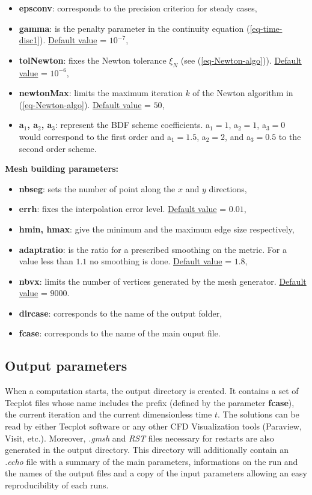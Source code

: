 \begin{itemize}
   \item {\bf epsconv}: corresponds to the precision criterion for steady cases,
   \item {\bf gamma}: is the penalty parameter in the continuity equation (\ref{eq-time-disc1}). \underline{Default value} = $10^{-7}$,
   \item {\bf tolNewton}: fixes the Newton tolerance $\xi_N$ (see (\ref{eq-Newton-algo})). \underline{Default value} = $10^{-6}$,
   \item {\bf newtonMax}: limits the maximum iteration $k$ of the Newton algorithm in (\ref{eq-Newton-algo}). \underline{Default value} = $50$,
   \item {\bf a$_1$, a$_2$, a$_3$}: represent the BDF scheme coefficients. a$_1 =1$, a$_2 = 1$, a$_3 = 0$ would correspond to the first order and a$_1 =1.5$, a$_2 = 2$, and a$_3 = 0.5$ to the second order scheme.
\end{itemize}
{\bf Mesh building parameters:}
\begin{itemize}
   \item {\bf nbseg}: sets the number of point along the $x$ and $y$ directions,
   \item {\bf errh}: fixes the interpolation error level. \underline{Default value} = $0.01$,
   \item {\bf hmin, hmax}: give the minimum and the maximum edge size respectively,
   \item {\bf adaptratio}: is the ratio for a prescribed smoothing on the metric. For a value less than $1.1$ no smoothing is done. \underline{Default value} = $1.8$,
   \item {\bf nbvx}: limits the number of vertices generated by the mesh generator. \underline{Default value} = $9000$.
\end{itemize}

   \begin{itemize}
      \item {\bf dircase}: corresponds to the name of the output folder,
      \item {\bf fcase}: corresponds to the name of the main ouput file.
   \end{itemize}

\subsection{Output parameters}
When a computation starts, the output directory is created.
It contains a set of Tecplot files whose name includes the prefix (defined by the parameter {\bf fcase}), the current iteration and the current dimensionless time $t$. 
The solutions can be read by either Tecplot software or any other CFD Visualization tools (Paraview, Visit, etc.).
Moreover, {\em .gmsh}  and {\em RST} files necessary for restarts are also generated in the output directory.
This directory will additionally contain an {\em .echo} file with a summary of the main parameters, informations on the run and the names of the output files and a copy of the input parameters allowing an easy reproducibility of each runs.

